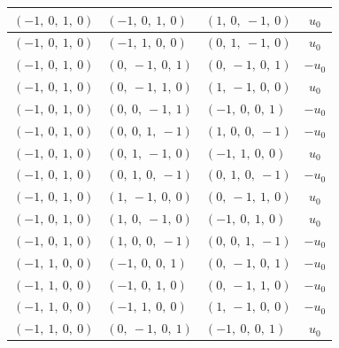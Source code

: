 \documentclass[11pt]{article}
\theoremstyle{definition}
\begin{document}
\begin{longtable}{|l|l|l|c|}
    \hline
    $\left( -1, \  0, \  1, \  0\right)$ & $\left( -1, \  0, \  1, \  0\right)$ & $\left( 1, \  0, \  -1, \  0\right)$ & $u_{0}$ \\
    \hline
    $\left( -1, \  0, \  1, \  0\right)$ & $\left( -1, \  1, \  0, \  0\right)$ & $\left( 0, \  1, \  -1, \  0\right)$ & $u_{0}$ \\
    \hline
    $\left( -1, \  0, \  1, \  0\right)$ & $\left( 0, \  -1, \  0, \  1\right)$ & $\left( 0, \  -1, \  0, \  1\right)$ & $- u_{0}$ \\
    \hline
    $\left( -1, \  0, \  1, \  0\right)$ & $\left( 0, \  -1, \  1, \  0\right)$ & $\left( 1, \  -1, \  0, \  0\right)$ & $u_{0}$ \\
    \hline
    $\left( -1, \  0, \  1, \  0\right)$ & $\left( 0, \  0, \  -1, \  1\right)$ & $\left( -1, \  0, \  0, \  1\right)$ & $- u_{0}$ \\
    \hline
    $\left( -1, \  0, \  1, \  0\right)$ & $\left( 0, \  0, \  1, \  -1\right)$ & $\left( 1, \  0, \  0, \  -1\right)$ & $- u_{0}$ \\
    \hline
    $\left( -1, \  0, \  1, \  0\right)$ & $\left( 0, \  1, \  -1, \  0\right)$ & $\left( -1, \  1, \  0, \  0\right)$ & $u_{0}$ \\
    \hline
    $\left( -1, \  0, \  1, \  0\right)$ & $\left( 0, \  1, \  0, \  -1\right)$ & $\left( 0, \  1, \  0, \  -1\right)$ & $- u_{0}$ \\
    \hline
    $\left( -1, \  0, \  1, \  0\right)$ & $\left( 1, \  -1, \  0, \  0\right)$ & $\left( 0, \  -1, \  1, \  0\right)$ & $u_{0}$ \\
    \hline
    $\left( -1, \  0, \  1, \  0\right)$ & $\left( 1, \  0, \  -1, \  0\right)$ & $\left( -1, \  0, \  1, \  0\right)$ & $u_{0}$ \\
    \hline
    $\left( -1, \  0, \  1, \  0\right)$ & $\left( 1, \  0, \  0, \  -1\right)$ & $\left( 0, \  0, \  1, \  -1\right)$ & $- u_{0}$ \\
    \hline
    $\left( -1, \  1, \  0, \  0\right)$ & $\left( -1, \  0, \  0, \  1\right)$ & $\left( 0, \  -1, \  0, \  1\right)$ & $- u_{0}$ \\
    \hline
    $\left( -1, \  1, \  0, \  0\right)$ & $\left( -1, \  0, \  1, \  0\right)$ & $\left( 0, \  -1, \  1, \  0\right)$ & $- u_{0}$ \\
    \hline
    $\left( -1, \  1, \  0, \  0\right)$ & $\left( -1, \  1, \  0, \  0\right)$ & $\left( 1, \  -1, \  0, \  0\right)$ & $- u_{0}$ \\
    \hline
    $\left( -1, \  1, \  0, \  0\right)$ & $\left( 0, \  -1, \  0, \  1\right)$ & $\left( -1, \  0, \  0, \  1\right)$ & $u_{0}$ \\

\end{longtable}
\end{document}

